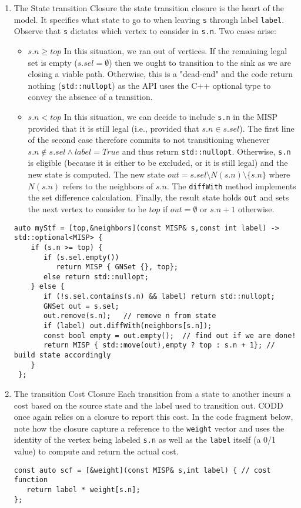\documentclass[11pt]{article}
\begin{document}
\begin{enumerate}
\item The State transition Closure
\label{sec:orgaeffcee}
the state transition closure is the heart of the model. It specifies what state to go to when leaving \texttt{s} through label \texttt{label}. Observe that \texttt{s} dictates which vertex to consider in \texttt{s.n}. Two cases arise:
\begin{itemize}
\item \(s.n \geq top\) In this situation, we ran out of vertices. If the remaining legal set is empty (\(s.sel = \emptyset\)) then we ought to transition to the sink as we are closing a viable path. Otherwise, this is a "dead-end" and the code return nothing (\texttt{std::nullopt}) as the API uses the C++ optional type to convey the absence of a transition.
\item \(s.n < top\) In this situation, we can decide to include \texttt{s.n} in the MISP provided that it is still legal (i.e., provided that \(s.n \in s.sel\)).
The first line of the second case therefore commits to not transitioning whenever
\(s.n \notin s.sel \wedge label=True\) and thus return \texttt{std::nullopt}. Otherwise, \texttt{s.n} is eligible (because it is either to be excluded, or it is still legal) and the new state is computed. The new state \(out = s.sel \setminus N(s.n) \setminus \{s.n\}\) where \(N(s.n)\) refers to the neighbors of \(s.n\).  The \texttt{diffWith} method implements the set difference calculation. Finally, the result state holds \texttt{out} and sets the next vertex to consider to be \(top\) if \(out = \emptyset\) or \(s.n + 1\) otherwise.
\end{itemize}

\begin{verbatim}
auto myStf = [top,&neighbors](const MISP& s,const int label) -> std::optional<MISP> {
    if (s.n >= top) {
       if (s.sel.empty()) 
          return MISP { GNSet {}, top};
       else return std::nullopt;
    } else {
       if (!s.sel.contains(s.n) && label) return std::nullopt; 
       GNSet out = s.sel;
       out.remove(s.n);   // remove n from state
       if (label) out.diffWith(neighbors[s.n]); 
       const bool empty = out.empty();  // find out if we are done!
       return MISP { std::move(out),empty ? top : s.n + 1}; // build state accordingly
    }
 };
\end{verbatim}

\item The transition Cost Closure
\label{sec:org7ba14b6}
Each transition from a state to another incurs a cost based on the source state and the label used to transition out. CODD once again relies on a closure to report this cost. In the code fragment below, note how the closure capture a reference to the \texttt{weight} vector and uses the identity of the vertex being labeled \texttt{s.n} as well as the \texttt{label} itself  (a 0/1 value) to compute and return the actual cost.
\begin{verbatim}
const auto scf = [&weight](const MISP& s,int label) { // cost function 
   return label * weight[s.n];
};
\end{verbatim}


\end{enumerate}
\end{document}
